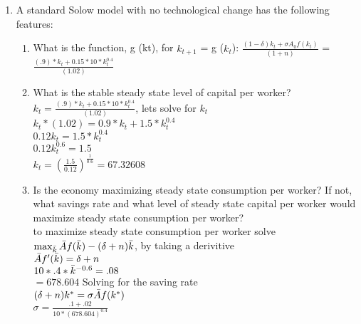\documentclass[12pt,oneside,reqno]{amsart}
\begin{document}
\begin{enumerate}
    \item A standard Solow model with no technological change has the following features:
    \begin{enumerate}
        \item What is the function, g (kt), for $k_{t+1}$ = g ($k_t$): $\frac{(1-\delta)k_t+\sigma A_0 f(k_t)}{(1+n)}$ = $\frac{(.9)*k_t+0.15*10 *k_t^{0.4}}{(1.02)}$
        \item What is the stable steady state level of capital per worker? \\
        $k_t =\frac{(.9)*k_t+0.15*10 *k_t^{0.4}}{(1.02)}$, lets solve for $k_t$ \\
        $k_t*(1.02) = 0.9*k_t+1.5*k_t^{0.4}$\\
        $0.12k_t=1.5*k_t^{0.4}$\\
        $0.12k_t^{0.6}=1.5$\\
        $k_t=(\frac{1.5}{0.12})^{\frac{1}{0.6}}=67.32608$
        
        \item Is the economy maximizing steady state consumption per worker? If not, what savings rate and what level of steady state capital per worker would maximize steady state consumption per worker?\\
        to maximize steady state consumption per worker solve\\ $\max_{\Bar{k}} \Bar{A}f(\Bar{k})-(\delta+n)\Bar{k}$, by taking a derivitive\\
        $\Bar{A}f'(\Bar{k})=\delta+n$\\
        $10*.4*\Bar{k}^{-0.6}=.08$\\
        $=678.604$
        Solving for the saving rate\\
        $(\delta+n)k^*=\sigma\Bar{A}f(k^*)$\\
        $\sigma = \frac{.1+.02}{10*(678.604)^{0.4}}$
        
        
    \end{enumerate}
\end{enumerate}
\end{document}
